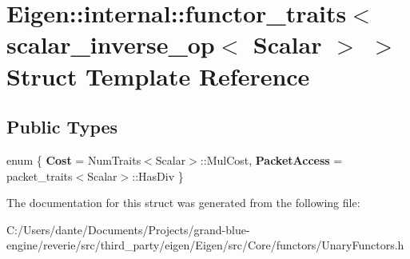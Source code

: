 \hypertarget{struct_eigen_1_1internal_1_1functor__traits_3_01scalar__inverse__op_3_01_scalar_01_4_01_4}{}\section{Eigen\+::internal\+::functor\+\_\+traits$<$ scalar\+\_\+inverse\+\_\+op$<$ Scalar $>$ $>$ Struct Template Reference}
\label{struct_eigen_1_1internal_1_1functor__traits_3_01scalar__inverse__op_3_01_scalar_01_4_01_4}
\subsection*{Public Types}
\begin{DoxyCompactItemize}
\item 
\mbox{\label{struct_eigen_1_1internal_1_1functor__traits_3_01scalar__inverse__op_3_01_scalar_01_4_01_4_a4c683d8b79224d470e2477ffcf6380f1}} 
enum \{ {\bfseries Cost} = Num\+Traits$<$Scalar$>$\+::Mul\+Cost, 
{\bfseries Packet\+Access} = packet\+\_\+traits$<$Scalar$>$\+::Has\+Div
 \}
\end{DoxyCompactItemize}


The documentation for this struct was generated from the following file\+:\begin{DoxyCompactItemize}
\item 
C\+:/\+Users/dante/\+Documents/\+Projects/grand-\/blue-\/engine/reverie/src/third\+\_\+party/eigen/\+Eigen/src/\+Core/functors/Unary\+Functors.\+h\end{DoxyCompactItemize}

